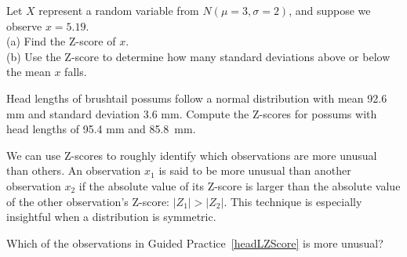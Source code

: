 \begin{exercisewrap}
\begin{nexercise}
Let $X$ represent a random variable from $N(\mu=3, \sigma=2)$,
and suppose we observe $x=5.19$. \\
(a)
    Find the Z-score of $x$. \\
(b)
    Use the Z-score to determine how many standard deviations
    above or below the mean $x$ falls.\footnotemark{}
\end{nexercise}
\end{exercisewrap}

\begin{exercisewrap}
\begin{nexercise} \label{headLZScore}
Head lengths of brushtail possums follow a normal
distribution with mean 92.6 mm and standard deviation 3.6 mm.
Compute the Z-scores for possums with head lengths of 95.4 mm
and 85.8~mm.\footnotemark{}
\end{nexercise}
\end{exercisewrap}

We can use Z-scores to roughly identify which observations
are more unusual than others.
An observation $x_1$ is said to be more unusual than another
observation $x_2$ if the absolute value of its Z-score is larger
than the absolute value of the other observation's Z-score:
$|Z_1| > |Z_2|$.
This technique is especially insightful when a distribution
is symmetric.

\begin{exercisewrap}
\begin{nexercise}
Which of the observations in Guided Practice~\ref{headLZScore}
is more unusual?\footnotemark{}
\end{nexercise}
\end{exercisewrap}




